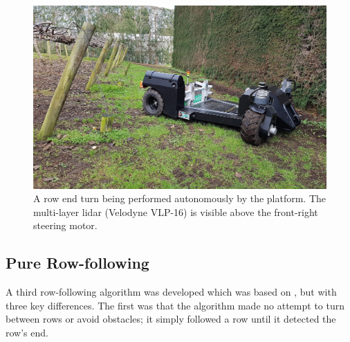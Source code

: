 \documentclass[preprint,authoryear,12pt]{elsarticle}
\begin{document}
    \begin{figure}[htb]
        \centering
        \includegraphics[width=\linewidth]{images/suzy_turning.jpg}
        \caption{
            A row end turn being performed autonomously by the platform.
            The multi-layer lidar (Velodyne VLP-16) is visible above the front-right steering motor.
        }
        \label{fig:suzy_turning}
    \end{figure}

    \subsection{Pure Row-following}
    \label{sub:rowfollowing}
      A third row-following algorithm was developed which was based on \cite{Bell2016}, but with three key differences.
      The first was that the algorithm made no attempt to turn between rows or avoid obstacles; it simply followed a row until it detected the row's end.
\end{document}
